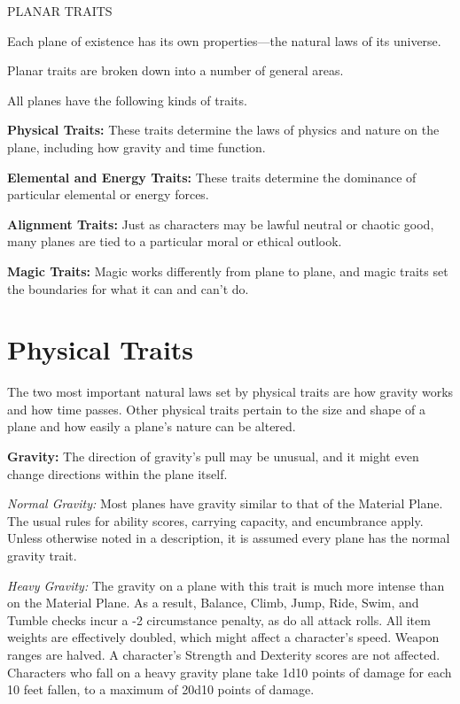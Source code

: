 \documentclass{article}
\begin{document}
\vspace{12pt}
PLANAR TRAITS

Each plane of existence has its own properties---the natural laws of its universe.

Planar traits are broken down into a number of general areas.

\vspace{12pt}
All planes have the following kinds of traits.

\textbf{Physical Traits:} These traits determine the laws of physics and nature 
on the plane, including how gravity and time function.

\textbf{Elemental and Energy Traits:} These traits determine the dominance of particular 
elemental or energy forces.

\textbf{Alignment Traits:} Just as characters may be lawful neutral or chaotic 
good, many planes are tied to a particular moral or ethical outlook.

\textbf{Magic Traits:} Magic works differently from plane to plane, and magic traits 
set the boundaries for what it can and can't do.

\vspace{12pt}
\section*{Physical Traits}

The two most important natural laws set by physical traits are how gravity works 
and how time passes. Other physical traits pertain to the size and shape of a plane 
and how easily a plane's nature can be altered.

\vspace{12pt}
\textbf{Gravity:} The direction of gravity's pull may be unusual, and it might 
even change directions within the plane itself.

\textit{Normal Gravity: }Most planes have gravity similar to that of the Material 
Plane. The usual rules for ability scores, carrying capacity, and encumbrance apply. 
Unless otherwise noted in a description, it is assumed every plane has the normal 
gravity trait.

\textit{Heavy Gravity: }The gravity on a plane with this trait is much more intense 
than on the Material Plane. As a result, Balance, Climb, Jump, Ride, Swim, and 
Tumble checks incur a -2 circumstance penalty, as do all attack rolls. All item 
weights are effectively doubled, which might affect a character's speed. Weapon 
ranges are halved. A character's Strength and Dexterity scores are not affected. 
Characters who fall on a heavy gravity plane take 1d10 points of damage for each 
10 feet fallen, to a maximum of 20d10 points of damage.
\end{document}
